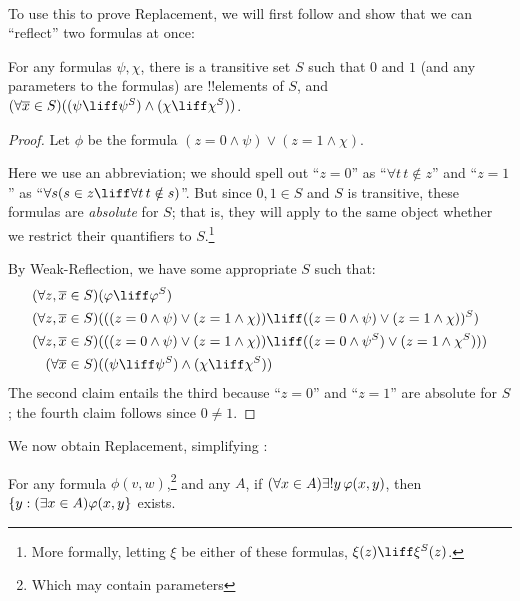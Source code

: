 \documentclass[../../../include/open-logic-section]{subfiles}
\begin{document}
\
\\
To use this to prove Replacement, we will first follow \citet[first
part of Theorem 2]{Levy1960} and show that we can ``reflect'' two
formulas at once:

\begin{lem}[in $\Z + \text{Weak-Reflection}$.]
For any formulas $\psi, \chi$, there is a transitive set $S$ such that $0$ and $1$ (and any parameters to the formulas) are !!{element}s of $S$, and $(\forall \overline{x} \in S)((\psi \liff \psi^S) \land (\chi \liff \chi^S))$.
\end{lem}

\begin{proof}
Let $\phi$ be the formula $(z = 0 \land \psi) \lor (z = 1 \land \chi)$. 

Here we use an abbreviation; we should spell out ``$z = 0$'' as
``$\forall t\, t \notin z$'' and ``$z =1$'' as ``$\forall s(s \in z
\liff \forall t\, t \notin s)$''. But since $0, 1 \in S$ and $S$ is
transitive, these formulas are \emph{absolute} for $S$; that is, they
will apply to the same object whether we restrict their quantifiers to
$S$.\footnote{More formally, letting $\xi$ be either of these
formulas, $\xi(z) \liff \xi^S(z)$.}

By Weak-Reflection, we have some appropriate $S$ such that:
\begin{align*}
	(\forall z, \overline{x} \in S)(&\phi \liff \phi^S)\\
	(\forall z, \overline{x} \in S)(&((z = 0 \land \psi) \lor (z = 1 \land \chi)) \liff 
	((z = 0 \land \psi) \lor (z = 1 \land \chi))^S)\\
	(\forall z, \overline{x} \in S)(&((z = 0 \land \psi) \lor (z = 1 \land \chi))\liff ((z = 0 \land \psi^S) \lor (z = 1 \land \chi^S)))\\
	(\forall \overline{x} \in S)(&(\psi \liff \psi^S) \land (\chi \liff \chi^S))
\end{align*}
The second claim entails the third because ``$z = 0$'' and ``$z=1$''
are absolute for $S$; the fourth claim follows since $0 \neq 1$.
\end{proof}\noindent We now obtain Replacement, simplifying
\citet[Theorem 6]{Levy1960}:

\begin{thm}\label{thm:replacement} 
For any formula $\phi(v,w)$,\footnote{Which may contain parameters}
and any $A$, if $(\forall x \in A)\lexists![y][\phi(x,y)]$, then
$\{ y : (\exists x \in A)\varphi(x,y \}$ exists.
\end{thm}
\end{document}
